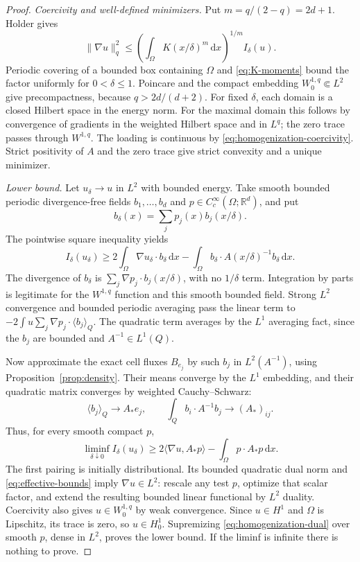 \documentclass[11pt,a4paper]{article}
\numberwithin{equation}{section}
\theoremstyle{definition}
\theoremstyle{remark}\newtheorem{remark}[theorem]{Remark}
\newcommand{\R}{\mathbb R}
\newcommand{\dd}{\,\mathrm dx}
\newcommand{\ip}[2]{\langle #1,#2\rangle}
\newcommand{\mean}[2]{\langle #1\rangle_{#2}}
\newcommand{\norm}[1]{\lVert #1\rVert}
\begin{document}
\begin{proof}
\emph{Coercivity and well-defined minimizers.}
Put \(m=q/(2-q)=2d+1\). Holder gives
\begin{equation}\label{eq:homogenization-coercivity}
 \norm{\nabla u}_q^2
 \leq\left(\int_\Omega K(x/\delta)^m\dd\right)^{1/m}
                       I_\delta(u).
\end{equation}
Periodic covering of a bounded box containing \(\Omega\) and
\eqref{eq:K-moments} bound the factor uniformly for \(0<\delta\leq1\).
Poincare and the compact embedding \(W^{1,q}_0\Subset L^2\)
give precompactness, because \(q>2d/(d+2)\).
For fixed \(\delta\), each domain is a closed Hilbert space in the
energy norm. For the maximal domain this follows by convergence of
gradients in the weighted Hilbert space and in \(L^q\); the zero
trace passes through \(W^{1,q}\). The loading is continuous by
\eqref{eq:homogenization-coercivity}. Strict positivity of \(A\)
and the zero trace give strict convexity and a unique minimizer.

\emph{Lower bound.}
Let \(u_\delta\to u\) in \(L^2\) with bounded energy.
Take smooth bounded periodic divergence-free fields
\(b_1,\ldots,b_d\) and \(p\in C_c^\infty(\Omega;\R^d)\), and put
\[
 b_\delta(x)=\sum_jp_j(x)b_j(x/\delta).
\]
The pointwise square inequality yields
\[
 I_\delta(u_\delta)\geq
 2\int_\Omega\nabla u_\delta\cdot b_\delta\dd
 -\int_\Omega b_\delta\cdot A(x/\delta)^{-1}b_\delta\dd.
\]
The divergence of \(b_\delta\) is
\(\sum_j\nabla p_j\cdot b_j(x/\delta)\), with no \(1/\delta\)
term. Integration by parts is legitimate for the \(W^{1,q}\)
function and this smooth bounded field.
Strong \(L^2\) convergence and bounded periodic averaging pass the
linear term to
\(-2\int u\sum_j\nabla p_j\cdot\mean{b_j}Q\).
The quadratic term averages by the \(L^1\) averaging fact, since
the \(b_j\) are bounded and \(A^{-1}\in L^1(Q)\).

Now approximate the exact cell fluxes \(B_{e_j}\) by such \(b_j\)
in \(L^2(A^{-1})\), using Proposition~\ref{prop:density}.
Their means converge by the \(L^1\) embedding, and their quadratic
matrix converges by weighted Cauchy--Schwarz:
\[
 \mean{b_j}Q\longrightarrow A_*e_j,\qquad
 \int_Qb_i\cdot A^{-1}b_j\longrightarrow(A_*)_{ij}.
\]
Thus, for every smooth compact \(p\),
\begin{equation}\label{eq:homogenization-dual}
 \liminf_{\delta\downarrow0}I_\delta(u_\delta)
 \geq2\ip{\nabla u}{A_*p}-\int_\Omega p\cdot A_*p\dd.
\end{equation}
The first pairing is initially distributional. Its bounded quadratic
dual norm and \eqref{eq:effective-bounds} imply \(\nabla u\in L^2\):
rescale any test \(p\), optimize that scalar factor, and extend the
resulting bounded linear functional by \(L^2\) duality.
Coercivity also gives \(u\in W^{1,q}_0\) by weak convergence.
Since \(u\in H^1\) and \(\Omega\) is Lipschitz, its trace is zero,
so \(u\in H^1_0\). Supremizing \eqref{eq:homogenization-dual} over
smooth \(p\), dense in \(L^2\), proves the lower bound.
If the liminf is infinite there is nothing to prove.


\end{proof}
\end{document}
